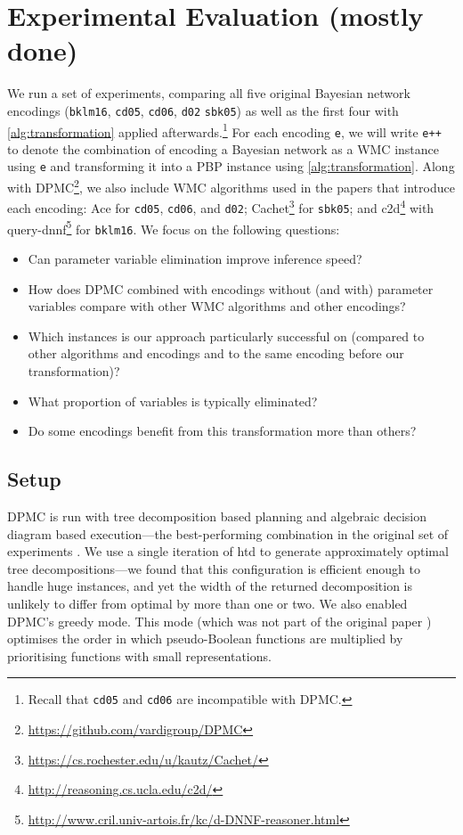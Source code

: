 \documentclass[runningheads]{llncs}
\begin{document}
\section{Experimental Evaluation (mostly done)}

We run a set of experiments, comparing all five original Bayesian network
encodings (\texttt{bklm16}, \texttt{cd05}, \texttt{cd06}, \texttt{d02}
\texttt{sbk05}) as well as the first four with \cref{alg:transformation} applied
afterwards.\footnote{Recall that \texttt{cd05} and \texttt{cd06} are
  incompatible with \textsf{DPMC}.} For each encoding \texttt{e}, we will write
\texttt{e++} to denote the combination of encoding a Bayesian network as a WMC
instance using \texttt{e} and transforming it into a PBP instance using
\cref{alg:transformation}. Along with
\textsf{DPMC}\footnote{\url{https://github.com/vardigroup/DPMC}}, we also
include WMC algorithms used in the papers that introduce each encoding:
\textsf{Ace} for \texttt{cd05}, \texttt{cd06}, and \texttt{d02};
\textsf{Cachet}\footnote{\url{https://cs.rochester.edu/u/kautz/Cachet/}}
\cite{DBLP:conf/sat/SangBBKP04} for \texttt{sbk05}; and
\textsf{c2d}\footnote{\url{http://reasoning.cs.ucla.edu/c2d/}}
\cite{DBLP:conf/ecai/Darwiche04} with
\textsf{query-dnnf}\footnote{\url{http://www.cril.univ-artois.fr/kc/d-DNNF-reasoner.html}}
for \texttt{bklm16}. We focus on the following questions:
\begin{itemize}
\item Can parameter variable elimination improve inference speed?
\item How does DPMC combined with encodings without (and with) parameter
  variables compare with other WMC algorithms and other encodings?
\item Which instances is our approach particularly successful on (compared to
  other algorithms and encodings and to the same encoding before our
  transformation)?
\item What proportion of variables is typically eliminated?
\item Do some encodings benefit from this transformation more than others?
\end{itemize}

\subsection{Setup}

\textsf{DPMC} is run with tree decomposition based planning and algebraic
decision diagram based execution---the best-performing combination in the
original set of experiments \cite{DBLP:conf/cp/DudekPV20}. We use a single
iteration of \textsf{htd} \cite{DBLP:conf/cpaior/AbseherMW17} to generate
approximately optimal tree decompositions---we found that this configuration
is efficient enough to handle huge instances, and yet the width of the
returned decomposition is unlikely to differ from optimal by more than one or
two. We also enabled \textsf{DPMC}'s greedy mode. This mode (which was not part
of the original paper \cite{DBLP:conf/cp/DudekPV20}) optimises the order in
which pseudo-Boolean functions are multiplied by prioritising functions with
small representations.
\end{document}
